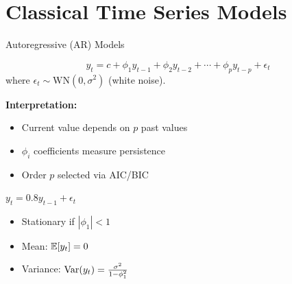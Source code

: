 \documentclass[aspectratio=169]{beamer}
\begin{document}
\section{Classical Time Series Models}

\begin{frame}{Autoregressive (AR) Models}
  \begin{definitionbox}[title={AR(p) Model}]
    \begin{equation}
      y_t = c + \phi_1 y_{t-1} + \phi_2 y_{t-2} + \cdots + \phi_p y_{t-p} + \epsilon_t
    \end{equation}
    where $\epsilon_t \sim \text{WN}(0, \sigma^2)$ (white noise).
  \end{definitionbox}

  \vspace{0.5em}

  \textbf{Interpretation:}
  \begin{itemize}
    \item Current value depends on $p$ past values
    \item $\phi_i$ coefficients measure persistence
    \item Order $p$ selected via AIC/BIC
  \end{itemize}

  \vspace{0.5em}

  \begin{examplebox}[title={AR(1) Example}]
    $y_t = 0.8 y_{t-1} + \epsilon_t$
    \begin{itemize}
      \item Stationary if $|\phi_1| < 1$
      \item Mean: $\mathbb{E}[y_t] = 0$
      \item Variance: $\operatorname{Var}(y_t) = \frac{\sigma^2}{1-\phi_1^2}$
    \end{itemize}
  \end{examplebox}
\end{frame}
\end{document}
